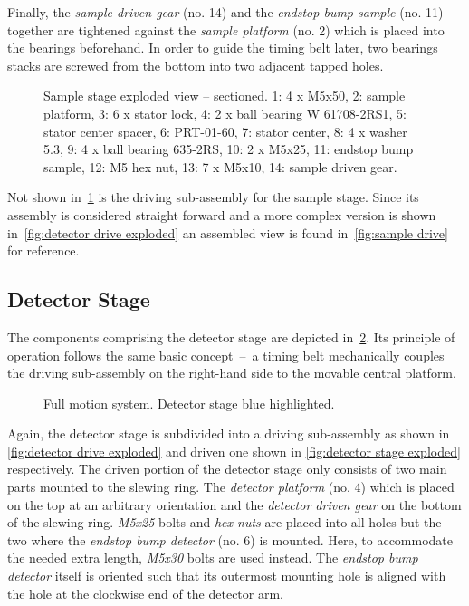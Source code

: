            Finally, the \textit{sample driven gear} (no. 14) and the \textit{endstop bump sample} (no. 11) together are tightened against the \textit{sample platform} (no. 2) which is placed into the bearings beforehand.
            In order to guide the timing belt later, two bearings stacks are screwed from the bottom into two adjacent tapped holes.

            \begin{figure}[h]
                \centering
                \caption[Sample stage exploded view -- sectioned.]{Sample stage exploded view -- sectioned. 1: 4 x M5x50, 2: sample platform, 3: 6 x stator lock, 4: 2 x ball bearing W 61708-2RS1, 5: stator center spacer, 6: PRT-01-60, 7: stator center, 8: 4 x washer 5.3, 9: 4 x ball bearing 635-2RS, 10: 2 x M5x25, 11: endstop bump sample, 12: M5 hex nut, 13: 7 x M5x10, 14: sample driven gear.}%
                \label{fig:sample stage exploded section}%
            \end{figure}%
            Not shown in~\cref{fig:sample stage exploded section} is the driving sub-assembly for the sample stage.
            Since its assembly is considered straight forward and a more complex version is shown in~\cref{fig:detector drive exploded} an assembled view is found in~\cref{fig:sample drive} for reference.

        \subsection{Detector Stage}\label{sec:detector stage}
            The components comprising the detector stage are depicted in~\cref{fig:xmagix full detector highlightes}.
            Its principle of operation follows the same basic concept~--~a timing belt mechanically couples the driving sub-assembly on the right-hand side to the movable central platform.
            \begin{figure}[h]
                \centering
                \caption[Full motion system. Detector stage blue highlighted.]{Full motion system. Detector stage blue highlighted.}%
                \label{fig:xmagix full detector highlightes}%
            \end{figure}
            Again, the detector stage is subdivided into a driving sub-assembly as shown in \cref{fig:detector drive exploded} and driven one shown in \cref{fig:detector stage exploded} respectively.
            The driven portion of the detector stage only consists of two main parts mounted to the slewing ring.
            The \textit{detector platform} (no. 4) which is placed on the top at an arbitrary orientation and the \textit{detector driven gear} on the bottom of the slewing ring.
            \textit{M5x25} bolts and \textit{hex nuts} are placed into all holes but the two where the \textit{endstop bump detector} (no. 6) is mounted.
            Here, to accommodate the needed extra length, \textit{M5x30} bolts are used instead.
            The \textit{endstop bump detector} itself is oriented such that its outermost mounting hole is aligned with the hole at the clockwise end of the detector arm.

